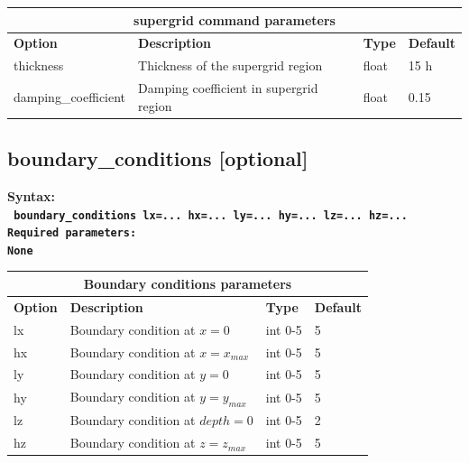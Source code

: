 \documentclass[11pt]{report}
\begin{document}
\begin{center}
\begin{tabular}{|l|p{10cm}|l|l|} \hline
\multicolumn{4}{|c|}{\bf supergrid command parameters}\\ \hline
\bf{Option} & \bf{Description} & \bf{Type} & \bf{Default} \\ \hline \hline
%
thickness &  Thickness of the supergrid region & float &  15 h\\ \hline
%
damping\_coefficient & Damping coefficient in supergrid region & float & 0.15 \\ \hline
\end{tabular}
\end{center}

\subsection{boundary\_conditions [optional]}
\label{keyword:boundary_conditions}
\begin{flushleft}\bf
Syntax:\\
\tt
boundary\_conditions lx=... hx=... ly=... hy=... lz=... hz=...
\\
\bf Required parameters:\\
\rm
None
\end{flushleft}

\begin{center}
\begin{tabular}{|l|p{10cm}|l|l|} \hline
\multicolumn{4}{|c|}{\bf Boundary conditions parameters}\\ \hline
\bf{Option} & \bf{Description} & \bf{Type} & \bf{Default} \\ \hline \hline
lx & Boundary condition at $x=0     $ & int 0-5 & 5 \\ \hline
hx & Boundary condition at $x=x_{max}$ & int 0-5 & 5 \\ \hline 
ly & Boundary condition at $y=0     $ & int 0-5 & 5 \\ \hline
hy & Boundary condition at $y=y_{max}$ & int 0-5 & 5 \\ \hline 
lz & Boundary condition at $depth=0 $ & int 0-5 & 2 \\ \hline 
hz & Boundary condition at $z=z_{max}$ & int 0-5 & 5 \\ \hline
\end{tabular}
\end{center}
\end{document}
